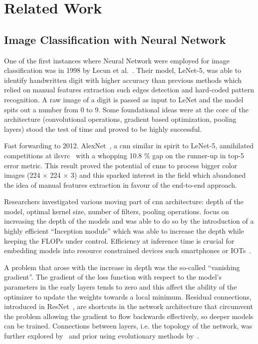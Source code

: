 \chapter{Related Work}
\label{ch:related-work}

\section{Image Classification with Neural Network}
\label{sec:image-classification-with-neural-network}

One of the first instances where Neural Network were employed for image
classification was in 1998 by Lecun et al.~\cite{GradientBasedLecun1998}. Their
model, LeNet-5, was able to identify handwritten digit with higher accuracy
than previous methods which relied on manual features extraction such edges
detection and hard-coded pattern recognition. A raw image of a digit is passed
as input to LeNet and the model spits out a number from 0 to 9. Some
foundational ideas were at the core of the architecture (convolutional
operations, gradient based optimization, pooling layers) stood the test of time
and proved to be highly successful.

Fast forwarding to 2012. AlexNet~\cite{ImagenetClassiKrizhe2017}, a
\acrfull{cnn} similar in spirit to LeNet-5, annihilated competitions at
\acrfull{ilsvrc}~\cite{ImagenetLargeRussak2014} with a whopping 10.8 \% gap on
the runner-up in top-5 error metric. This result proved the potential of
\acrshort{cnn}s to process bigger color images (224 × 224 × 3) and this sparked
interest in the field which abandoned the idea of manual features extraction in
favour of the end-to-end approach.

Researchers investigated various moving part of \acrshort{cnn} architecture:
depth of the model, optimal kernel size, number of filters, pooling operations.
\cite{VeryDeepConvoSimony2014,GoingDeeperWiSzeged2014} focus on increasing the
depth of the models and \cite{GoingDeeperWiSzeged2014} was able to do so by the
introduction of a highly efficient ``Inception module'' which was able to
increase the depth while keeping the FLOPs under control. Efficiency at
inference time is crucial for embedding models into resource constrained
devices such smartphones or IOTs~\cite{SqueezenetAleIandol2016,
MnasnetPlatfoTanM2018, MobilenetsEffHoward2017}.

A problem that arose with the increase in depth was the so-called ``vanishing
gradient''. The gradient of the loss function with respect to the model's
parameters in the early layers tends to zero and this affect the ability of the
optimizer to update the weights towards a local minimum. Residual connections,
introduced in ResNet~\cite{DeepResidualLHeKa2015, IdentityMappinHeKa2016}, are
shortcuts in the network architecture that circumvent the problem allowing the
gradient to flow backwards effectively, so deeper models can be trained.
Connections between layers, i.e. the topology of the network, was further
explored by~\cite{DualPathNetwoChen2017, DenselyConnectHuang2016} and prior
using evolutionary methods by~\cite{DesigningNeuraMiller1989,
EvolvingNeuralStanle2002}.

